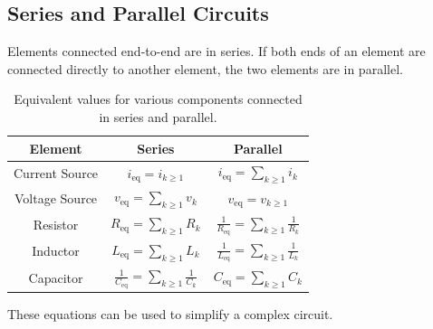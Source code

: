 \documentclass{article}
\begin{document}
\subsection{Series and Parallel Circuits}
\begin{definition}
    Elements connected end-to-end are in series. If both ends of an element are connected directly to another element, the two elements are in parallel.
\end{definition}
\begin{table}[H]
    \centering
    \begin{tabular}{c c c}
        \toprule
        \textbf{Element} & \textbf{Series}                                                           & \textbf{Parallel}                                                         \\
        \midrule
        Current Source   & \(\displaystyle i_{\mathrm{eq}} = i_{k\geq1}\)                            & \(i_{\mathrm{eq}} = \displaystyle \sum_{k\geq1} i_k\)                     \\
        Voltage Source   & \(\displaystyle v_{\mathrm{eq}} = \sum_{k\geq1} v_k\)                     & \(\displaystyle v_{\mathrm{eq}} = v_{k\geq1}\)                            \\
        Resistor         & \(\displaystyle R_{\mathrm{eq}} = \sum_{k\geq1} R_k\)                     & \(\displaystyle \frac{1}{R_{\mathrm{eq}}} = \sum_{k\geq1} \frac{1}{R_k}\) \\
        Inductor         & \(\displaystyle L_{\mathrm{eq}} = \sum_{k\geq1} L_k\)                     & \(\displaystyle \frac{1}{L_{\mathrm{eq}}} = \sum_{k\geq1} \frac{1}{L_k}\) \\
        Capacitor        & \(\displaystyle \frac{1}{C_{\mathrm{eq}}} = \sum_{k\geq1} \frac{1}{C_k}\) & \(\displaystyle C_{\mathrm{eq}} = \sum_{k\geq1} C_k\)                     \\
        \bottomrule
    \end{tabular}
    \caption{Equivalent values for various components connected in series and parallel.}
\end{table}
These equations can be used to simplify a complex circuit.
\end{document}
